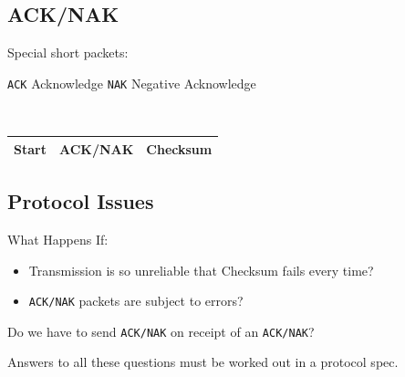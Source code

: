 \subsection{ACK/NAK}

Special short packets:

{\tt ACK} Acknowledge
{\tt NAK} Negative Acknowledge

{\tt
\begin{tabular}{|c|c|c|}
\hline
Start &   ACK/NAK &  Checksum  \\
\hline
\end{tabular}
}

\subsection{Protocol Issues}

What Happens If:
\begin{itemize}
        \item Transmission is so unreliable that Checksum fails
                every time?
        \item {\tt ACK/NAK} packets are subject to errors?
\end{itemize}
Do we have to send {\tt ACK/NAK} on receipt of an {\tt ACK/NAK}?

Answers to all these questions must be worked out in a
protocol spec.

%

